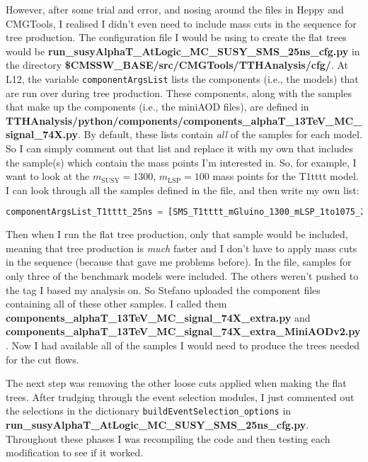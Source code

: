However, after some trial and error, and nosing around the files in Heppy and CMGTools, I realised I didn't even need to include mass cuts in the sequence for tree production. The configuration file I would be using to create the flat trees would be \textbf{run\_susyAlphaT\_AtLogic\_MC\_SUSY\_SMS\_25ns\_cfg.py} in the directory \textbf{\$CMSSW\_BASE/src/CMGTools/TTHAnalysis/cfg/}. At L12, the variable \verb!componentArgsList! lists the components (i.e., the models) that are run over during tree production. These components, along with the samples that make up the components (i.e., the miniAOD files), are defined in \textbf{TTHAnalysis/python/components/components\_alphaT\_13TeV\_MC\_signal\_74X.py}. By default, these lists contain \emph{all} of the samples for each model. So I can simply comment out that list and replace it with my own that includes the sample(s) which contain the mass points I'm interested in. So, for example, I want to look at the $m_{\mathrm{SUSY}} = 1300$, $m_{\mathrm{LSP}} = 100$ mass points for the T1tttt model. I can look through all the samples defined in the file, and then write my own list:

\begin{lstlisting}[belowskip=-0.7cm, language=python, numbers=none]
componentArgsList_T1tttt_25ns = [SMS_T1tttt_mGluino_1300_mLSP_1to1075_25ns,]
\end{lstlisting}

Then when I run the flat tree production, only that sample would be included, meaning that tree production is \emph{much} faster and I don't have to apply mass cuts in the sequence (because that gave me problems before). In the file, samples for only three of the benchmark models were included. The others weren't pushed to the tag I based my analysis on. So Stefano uploaded the component files containing all of these other samples. I called them \textbf{components\_alphaT\_13TeV\_MC\_signal\_74X\_extra.py} and \textbf{components\_alphaT\_13TeV\_MC\_signal\_74X\_extra\_MiniAODv2.py}. Now I had available all of the samples I would need to produce the trees needed for the cut flows.

The next step was removing the other loose cuts applied when making the flat trees. After trudging through the event selection modules, I just commented out the selections in the dictionary \texttt{buildEventSelection\_options} in \textbf{run\_susyAlphaT\_AtLogic\_MC\_SUSY\_SMS\_25ns\_cfg.py}. Throughout these phases I was recompiling the code and then testing each modification to see if it worked.

